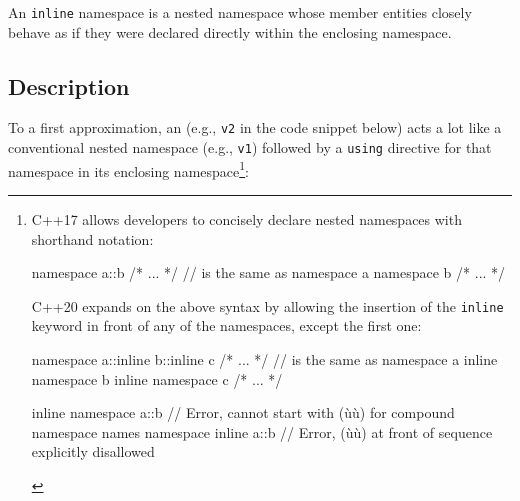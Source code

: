 
\setcounter{table}{0}
\setcounter{footnote}{0}
\setcounter{lstlisting}{0}


An \lstinline!inline! namespace is a nested namespace whose member entities
closely behave as if they were declared directly within the enclosing
namespace.

\subsection[Description]{Description}\label{description-inlinenamespace}

To a first approximation, an 
(e.g., \lstinline!v2! in the code snippet below) acts a lot like a
conventional nested namespace (e.g., \lstinline!v1!) followed by a
\lstinline!using! directive for that namespace in its enclosing namespace{\cprotect\footnote{C++17 allows developers to concisely declare nested
namespaces with shorthand notation:
\begin{emcppslisting}[style=footcode]
namespace a::b { /* ... */ }
// is the same as
namespace a { namespace b { /* ... */ } }
\end{emcppslisting}
C++20 expands on the above syntax by allowing the insertion of the
\lstinline!inline! keyword in front of any of the namespaces, except the
first one:
\begin{emcppslisting}[style=footcode]
namespace a::inline b::inline c { /* ... */ }
// is the same as
namespace a { inline namespace b { inline namespace c { /* ... */ } } }

inline namespace a::b { }  // Error, cannot start with (ù{}ù) for compound namespace names
namespace inline a::b { }  // Error, (ù{}ù) at front of sequence explicitly disallowed
\end{emcppslisting}
      }}:

